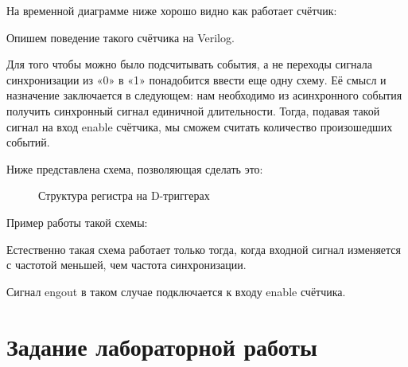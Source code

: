 \documentclass[a5paper, DIV=14, headings=openany, twoside=true,fontsize=10pt, titlepage]{scrreprt}
\newcommand{\quotes}[1]{«#1»}
\newcommand{\eng}[1]{\foreignlanguage{english}{#1}}
\begin{document}
\par{На временной диаграмме ниже хорошо видно как работает счётчик:}
		
\par{Опишем поведение такого счётчика на \eng{Verilog}.}


		
\par{Для того чтобы можно было подсчитывать события, а не переходы сигнала синхронизации из \quotes{0} в \quotes{1} понадобится ввести еще одну схему. Её смысл и назначение заключается в следующем: нам необходимо из асинхронного события получить синхронный сигнал единичной длительности. Тогда, подавая такой сигнал на вход \eng{enable} счётчика, мы сможем считать количество произошедших событий.}
		
\par{Ниже представлена схема, позволяющая сделать это:}

\begin{figure}[H]
	\centering
	\def\svgwidth{\columnwidth}
	
	\caption{Структура регистра на \eng{D}-триггерах}
\end{figure}
		
\par{Пример работы такой схемы:}

\par{Естественно такая схема работает только тогда, когда входной сигнал изменяется с частотой меньшей, чем частота синхронизации.}

\par{Сигнал eng{out} в таком случае подключается к входу \eng{enable} счётчика.}		
		
\section{Задание лабораторной работы}
\end{document}
